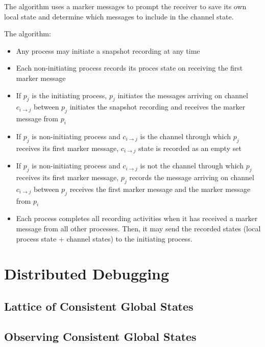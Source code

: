 \begin{multicols*}{2}
\noindent The algorithm uses a marker messages to prompt the receiver to save its own local state and determine which messages to include in the channel state.

\noindent The algorithm:

\begin{itemize}
  \item Any process may initiate a snapshot recording at any time
  \item Each non-initiating process records its proces state on receiving the first marker message
  \item If $p_j$ is the initiating process, $p_j$ initiates the messages arriving on channel $c_{i\rightarrow j}$ between $p_j$ initiates the snapshot recording and receives the marker message from $p_i$
  \item If $p_j$ is non-initiating process and $c_{i\rightarrow j}$ is the channel through which $p_j$ receives its first marker message, $c_{i\rightarrow j}$ state is recorded as an empty set
  \item If $p_j$ is non-initiating process and $c_{i\rightarrow j}$ is not the channel through which $p_j$ receives its first marker message, $p_j$ records the message arriving on channel $c_{i\rightarrow j}$ between $p_j$ receives the first marker message and the marker message from $p_i$
  \item Each process completes all recording activities when it has received a marker message from all other processes. Then, it may send the recorded states (local process state + channel states) to the initiating process.
\end{itemize}

\section{Distributed Debugging}

\subsection{Lattice of Consistent Global States}

\subsection{Observing Consistent Global States}

\end{multicols*}

